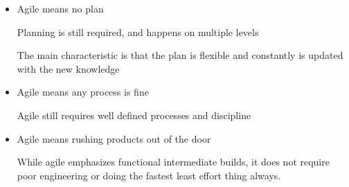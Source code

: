 \documentclass{report}
\begin{document}
\begin{description}
        \begin{itemize}
            \item Agile means no plan
                \begin{mdframed}
                    Planning is still required,
                    and happens on multiple levels

                    The main characteristic is that the
                    plan is flexible and constantly is
                    updated with the new knowledge
                \end{mdframed}
            \item Agile means any process is fine
                \begin{mdframed}
                    Agile still requires well defined
                    processes and discipline
                \end{mdframed}
                \pagebreak
            \item Agile means rushing products out of the door
                \begin{mdframed}
                    While agile emphasizes functional intermediate
                    builds, it does not require poor engineering
                    or doing the fastest least effort thing
                    always.


\end{mdframed}
\end{itemize}
\end{description}
\end{document}
